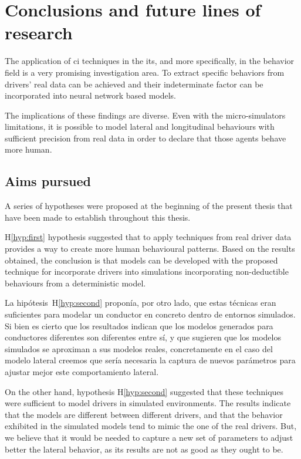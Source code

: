 \chapter{Conclusions and future lines of research}
\label{ch:conclusions-eng}

The application of \acrlong{ci} techniques in the \acrshort{its}, and more specifically, in the behavior field is a very promising investigation area. To extract specific behaviors from drivers’ real data can be achieved and their indeterminate factor can be incorporated into neural network based models.

The implications of these findings are diverse. Even with the micro-simulators limitations, it is possible to model lateral and longitudinal behaviours with sufficient precision from real data in order to declare that those agents behave more human.

\section{Aims pursued}

A series of hypotheses were proposed at the beginning of the present thesis that have been made to establish throughout this thesis.

H\ref{hyp:first} hypothesis suggested that to apply  techniques from real driver data provides a way to create more human behavioural patterns. Based on the results obtained, the conclusion is that models can be developed with the proposed technique for incorporate drivers into simulations incorporating non-deductible behaviours from a deterministic model.

La hipótesis~H\ref{hyp:second} proponía, por otro lado, que estas técnicas eran suficientes para modelar un conductor en concreto dentro de entornos simulados. Si bien es cierto que los resultados indican que los modelos generados para conductores diferentes son diferentes entre sí, y que sugieren que los modelos simulados se aproximan a sus modelos reales, concretamente en el caso del modelo lateral creemos que sería necesaria la captura de nuevos parámetros para ajustar mejor este comportamiento lateral.

On the other hand, hypothesis H\ref{hyp:second} suggested that these techniques were sufficient to model drivers in simulated environments. The results indicate that the models are different between different drivers, and that the behavior exhibited in the simulated models tend to mimic the one of the real drivers. But, we believe that it would be needed to capture a new set of parameters to adjust better the lateral behavior, as its results are not as good as they ought to be.

